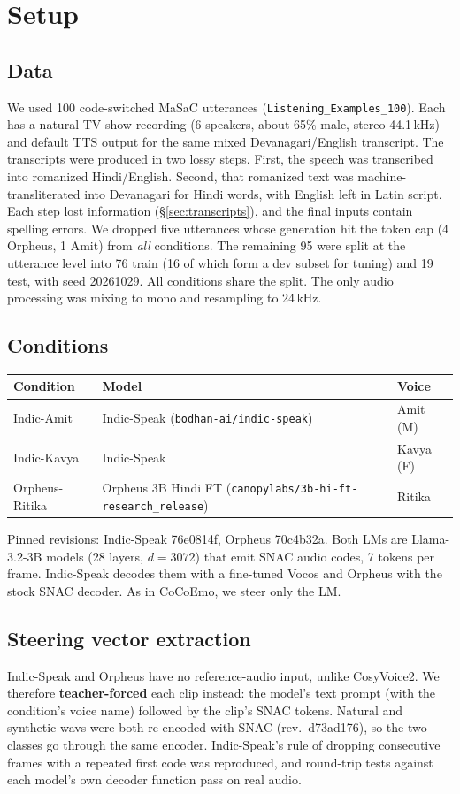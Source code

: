 \documentclass[11pt]{article}
\begin{document}
\section{Setup}

\subsection{Data}
We used 100 code-switched MaSaC utterances (\texttt{Listening\_Examples\_100}). Each has a natural TV-show recording (6 speakers, about 65\% male, stereo 44.1\,kHz) and default TTS output for the same mixed Devanagari/English transcript. The transcripts were produced in two lossy steps. First, the speech was transcribed into romanized Hindi/English. Second, that romanized text was machine-transliterated into Devanagari for Hindi words, with English left in Latin script. Each step lost information (\S\ref{sec:transcripts}), and the final inputs contain spelling errors. We dropped five utterances whose generation hit the token cap (4 Orpheus, 1 Amit) from \emph{all} conditions. The remaining 95 were split at the utterance level into 76 train (16 of which form a dev subset for tuning) and 19 test, with seed 20261029. All conditions share the split. The only audio processing was mixing to mono and resampling to 24\,kHz.

\subsection{Conditions}
\begin{center}
\begin{tabular}{lp{}l}
\toprule
Condition & Model & Voice \\
\midrule
Indic-Amit & Indic-Speak (\texttt{bodhan-ai/indic-speak}) & Amit (M) \\
Indic-Kavya & Indic-Speak & Kavya (F) \\
Orpheus-Ritika & Orpheus 3B Hindi FT (\texttt{canopylabs/3b-hi-ft-\allowbreak research\_release}) & Ritika \\
\bottomrule
\end{tabular}
\end{center}
Pinned revisions: Indic-Speak 76e0814f, Orpheus 70c4b32a. Both LMs are Llama-3.2-3B models (28 layers, $d=3072$) that emit SNAC audio codes, 7 tokens per frame. Indic-Speak decodes them with a fine-tuned Vocos and Orpheus with the stock SNAC decoder. As in CoCoEmo, we steer only the LM.

\subsection{Steering vector extraction}
Indic-Speak and Orpheus have no reference-audio input, unlike CosyVoice2. We therefore \textbf{teacher-forced} each clip instead: the model's text prompt (with the condition's voice name) followed by the clip's SNAC tokens. Natural and synthetic wavs were both re-encoded with SNAC (rev.\ d73ad176), so the two classes go through the same encoder. Indic-Speak's rule of dropping consecutive frames with a repeated first code was reproduced, and round-trip tests against each model's own decoder function pass on real audio.
\end{document}
